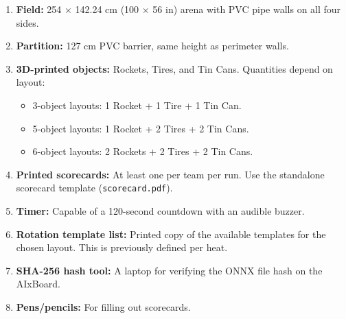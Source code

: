\documentclass[a4]{article}
\begin{document}
\begin{enumerate}[label=$\square$]
    \item \textbf{Field:} 254 $\times$ 142.24 cm (100 $\times$ 56 in) arena with PVC pipe walls on all four sides.
    \item \textbf{Partition:} 127 cm PVC barrier, same height as perimeter walls.
    \item \textbf{3D-printed objects:} Rockets, Tires, and Tin Cans. Quantities depend on layout:
    \begin{itemize}
        \item 3-object layouts: 1 Rocket + 1 Tire + 1 Tin Can.
        \item 5-object layouts: 1 Rocket + 2 Tires + 2 Tin Cans.
        \item 6-object layouts: 2 Rockets + 2 Tires + 2 Tin Cans.
    \end{itemize}
    \item \textbf{Printed scorecards:} At least one per team per run. Use the standalone scorecard template (\texttt{scorecard.pdf}).
    \item \textbf{Timer:} Capable of a 120-second countdown with an audible buzzer.
    \item \textbf{Rotation template list:} Printed copy of the available templates for the chosen layout. This is previously defined per heat. 
    \item \textbf{SHA-256 hash tool:} A laptop for verifying the ONNX file hash on the AIxBoard.
    \item \textbf{Pens/pencils:} For filling out scorecards.
\end{enumerate}
\end{document}
